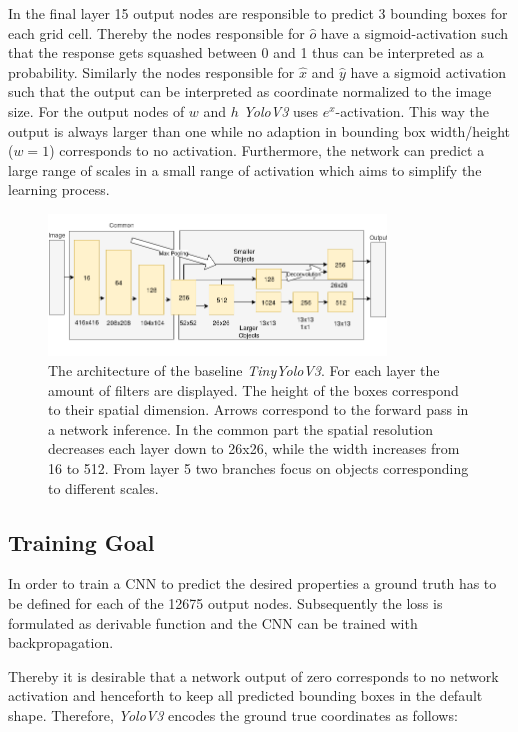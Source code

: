 In the final layer 15 output nodes are responsible to predict 3 bounding boxes for each grid cell. Thereby the nodes responsible for $\hat o$ have a sigmoid-activation such that the response gets squashed between 0 and 1 thus can be interpreted as a probability. Similarly the nodes responsible for $\hat x$ and $\hat y$ have a sigmoid activation such that the output can be interpreted as coordinate normalized to the image size. For the output nodes of $w$ and $h$ \textit{YoloV3} uses $e^x$-activation. This way the output is always larger than one while no adaption in bounding box width/height ($w=1$) corresponds to no activation. Furthermore, the network can predict a large range of scales in a small range of activation which aims to simplify the learning process.


\begin{figure}[hbtp]
	\centering
	\includegraphics[width=0.8\textwidth]{fig/tinyyolov3_arch}
	\caption{The architecture of the baseline \textit{TinyYoloV3}. For each layer the amount of filters are displayed. The height of the boxes correspond to their spatial dimension. Arrows correspond to the forward pass in a network inference. In the common part the spatial resolution decreases each layer down to 26x26, while the width increases from 16 to 512. From layer 5 two branches focus on objects corresponding to different scales. }
	\label{fig:tinyyolov3_arch}
\end{figure}

	\subsection{Training Goal}

In order to train a \ac{CNN} to predict the desired properties a ground truth has to be defined for each of the 12675 output nodes. Subsequently the loss is formulated as derivable function and the \ac{CNN} can be trained with backpropagation.

Thereby it is desirable that a network output of zero corresponds to no network activation and henceforth to keep all predicted bounding boxes in the default shape. Therefore, \textit{YoloV3} encodes the ground true coordinates as follows:


